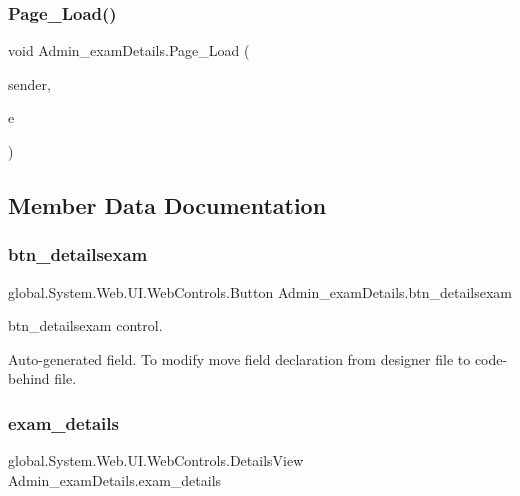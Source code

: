 \mbox{\label{class_admin__exam_details_ad014a034b0275bc06c370cb1237510a3}} 
\subsubsection{\texorpdfstring{Page\_Load()}{Page\_Load()}}
{\footnotesize\ttfamily void Admin\+\_\+exam\+Details.\+Page\+\_\+\+Load (\begin{DoxyParamCaption}\item[{object}]{sender,  }\item[{Event\+Args}]{e }\end{DoxyParamCaption})\hspace{0.3cm}{\ttfamily [protected]}}



\subsection{Member Data Documentation}
\mbox{\label{class_admin__exam_details_a3599c2b50cf49795d72693d1bfda6c34}} 
\subsubsection{\texorpdfstring{btn\_detailsexam}{btn\_detailsexam}}
{\footnotesize\ttfamily global.\+System.\+Web.\+U\+I.\+Web\+Controls.\+Button Admin\+\_\+exam\+Details.\+btn\+\_\+detailsexam\hspace{0.3cm}{\ttfamily [protected]}}



btn\+\_\+detailsexam control. 

Auto-\/generated field. To modify move field declaration from designer file to code-\/behind file. \mbox{\label{class_admin__exam_details_afdfbbd6b753e1569ba22d7bc302a15a1}} 
\subsubsection{\texorpdfstring{exam\_details}{exam\_details}}
{\footnotesize\ttfamily global.\+System.\+Web.\+U\+I.\+Web\+Controls.\+Details\+View Admin\+\_\+exam\+Details.\+exam\+\_\+details\hspace{0.3cm}{\ttfamily [protected]}}



